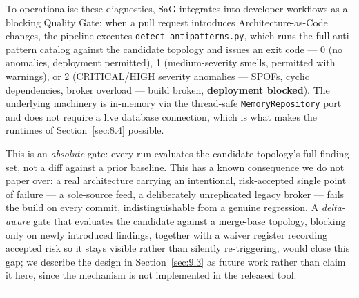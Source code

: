 \label{sec:6.2}

To operationalise these diagnostics, SaG integrates into developer workflows as a blocking Quality
Gate: when a pull request introduces Architecture-as-Code changes, the pipeline executes
\texttt{detect\_antipatterns.py}, which runs the full anti-pattern catalog against the candidate
topology and issues an exit code --- 0 (no anomalies, deployment permitted), 1 (medium-severity
smells, permitted with warnings), or 2 (CRITICAL/HIGH severity anomalies --- SPOFs, cyclic
dependencies, broker overload --- build broken, \textbf{deployment blocked}). The underlying
machinery is in-memory via the thread-safe \texttt{MemoryRepository} port and does not require a live
database connection, which is what makes the runtimes of Section~\ref{sec:8.4} possible.

This is an \emph{absolute} gate: every run evaluates the candidate topology's full finding set, not a
diff against a prior baseline. This has a known consequence we do not paper over: a real architecture
carrying an intentional, risk-accepted single point of failure --- a sole-source feed, a deliberately
unreplicated legacy broker --- fails the build on every commit, indistinguishable from a genuine
regression. A \emph{delta-aware} gate that evaluates the candidate against a merge-base topology,
blocking only on newly introduced findings, together with a waiver register recording accepted risk
so it stays visible rather than silently re-triggering, would close this gap; we describe the design
in Section~\ref{sec:9.3} as future work rather than claim it here, since the mechanism is not
implemented in the released tool.

\begin{center}\rule{0.5\linewidth}{0.5pt}\end{center}
